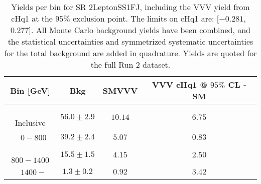 \begin{table}[!htbp]
    \small
    \center
    \begin{tabular}{c||c|c|c}
    Bin [GeV] & Bkg & SMVVV & \pbox{20cm}{VVV \\ cHq1 @ $95\%$ CL - SM \\ }\\
    \hline
    \pbox{20cm}{ ~ \\Inclusive\\ } & $56.0 \pm 2.9$ & $10.14$ & $6.75$\\
    \hline
    \pbox{20cm}{ ~ \\$0-800$\\ } & $39.2 \pm 2.4$ & $5.07$ & $0.83$\\
    \hline
    \pbox{20cm}{ ~ \\$800-1400$\\ } & $15.5 \pm 1.5$ & $4.15$ & $2.50$\\
    \hline
    \pbox{20cm}{ ~ \\$1400-$\\ } & $1.3 \pm 0.2$ & $0.92$ & $3.42$\\
\end{tabular}
    \caption{Yields per bin for SR 2LeptonSS1FJ, including the VVV yield from cHq1 at the $95$\% exclusion point. The limits on cHq1 are: [$-0.281$,~$0.277$]. All Monte Carlo background yields have been combined, and the statistical uncertainties and symmetrized systematic uncertainties for the total background are added in quadrature. Yields are quoted for the full Run 2 dataset.}
    \label{tab:2LeptonSS1FJ$binssignal}
\end{table}
